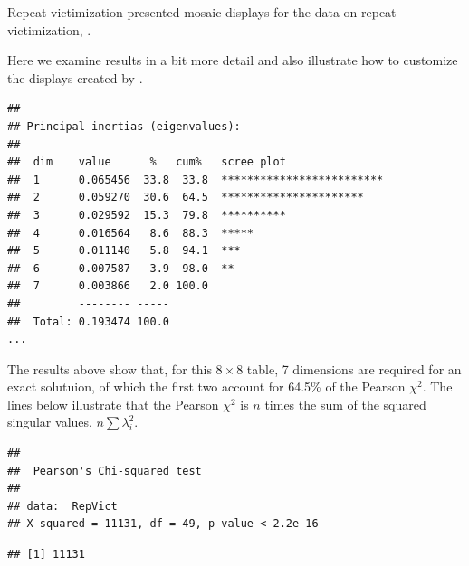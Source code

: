 \documentclass[11pt]{book}
\renewenvironment{knitrout}{\small\renewcommand{\baselinestretch}{.85}}{} %
\begin{document}
\begin{Example}[victims2]{Repeat victimization}
 presented mosaic displays for the data on repeat
victimization, .

Here we examine \ca results in a bit more detail
and also illustrate how to customize the
displays created by .

\begin{knitrout}
\color{fgcolor}\begin{kframe}
\begin{alltt}
\hlstd{(}\hlstd{,} \hlstd{=}\hlstd{)}
 \hlkwb{<-} 
\end{alltt}
\begin{verbatim}
## 
## Principal inertias (eigenvalues):
## 
##  dim    value      %   cum%   scree plot               
##  1      0.065456  33.8  33.8  *************************
##  2      0.059270  30.6  64.5  **********************   
##  3      0.029592  15.3  79.8  **********               
##  4      0.016564   8.6  88.3  *****                    
##  5      0.011140   5.8  94.1  ***                      
##  6      0.007587   3.9  98.0  **                       
##  7      0.003866   2.0 100.0                           
##         -------- -----                                 
##  Total: 0.193474 100.0                                 
...
\end{verbatim}
\end{kframe}
\end{knitrout}
The results above show that, for this $8 \times 8$ table, 7 dimensions
are required for an exact solutuion, of which the first two account for
64.5\% of the Pearson $\chi^2$.
The lines below illustrate that the Pearson $\chi^2$ is $n$ times the
sum of the squared singular values, 
$n \sum \lambda_i^2$.

\begin{knitrout}
\color{fgcolor}\begin{kframe}
\begin{alltt}
\end{alltt}
\begin{verbatim}
## 
## 	Pearson's Chi-squared test
## 
## data:  RepVict
## X-squared = 11131, df = 49, p-value < 2.2e-16
\end{verbatim}
\begin{alltt}
 \hlkwb{<-}  \hlopt{*} \hlopt{$}\hlopt{^}\hlstd{))}
\end{alltt}
\begin{verbatim}
## [1] 11131
\end{verbatim}
\end{kframe}
\end{knitrout}


\end{Example}
\end{document}
